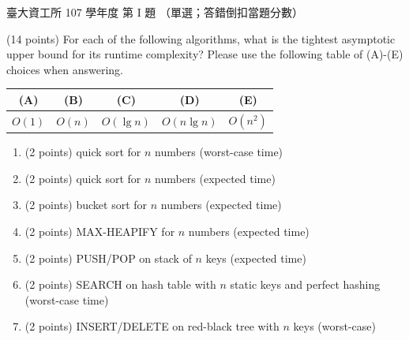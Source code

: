 \begin{pastexam}[label={px:ntu-107-dsa-01}]{臺大資工所 107 學年度 第 I 題}
（單選；答錯倒扣當題分數）

(14 points) For each of the following algorithms, what is the tightest asymptotic upper bound for
its runtime complexity? Please use the following table of (A)-(E) choices when answering.
\begin{center}
\begin{tabular}{|c|c|c|c|c|}
\hline
(A) & (B) & (C) & (D) & (E) \\ \hline
$O(1)$ & $O(n)$ & $O(\lg n)$ & $O(n\lg n)$ & $O(n^2)$ \\ \hline
\end{tabular}
\end{center}
\begin{enumerate}[label=\textbf{\arabic*.}]
\item (2 points) quick sort for $n$ numbers (worst-case time)
\item (2 points) quick sort for $n$ numbers (expected time)
\item (2 points) bucket sort for $n$ numbers (expected time)
\item (2 points) MAX-HEAPIFY for $n$ numbers (expected time)
\item (2 points) PUSH/POP on stack of $n$ keys (expected time)
\item (2 points) SEARCH on hash table with $n$ static keys and perfect hashing (worst-case time)
\item (2 points) INSERT/DELETE on red-black tree with $n$ keys (worst-case)
\end{enumerate}
\end{pastexam}


